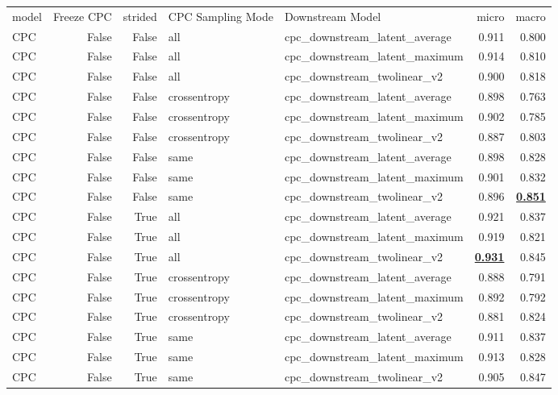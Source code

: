 \begin{adjustbox}{width=\textwidth}
\begin{tabular}{lrrllrr}
{model} & {Freeze CPC} & {strided} & {CPC Sampling Mode} & {Downstream Model} & {micro} & {macro} \\
CPC & False & False & all & cpc\_downstream\_latent\_average & 0.911 & 0.800 \\
CPC & False & False & all & cpc\_downstream\_latent\_maximum & 0.914 & 0.810 \\
CPC & False & False & all & cpc\_downstream\_twolinear\_v2 & 0.900 & 0.818 \\
CPC & False & False & crossentropy & cpc\_downstream\_latent\_average & 0.898 & 0.763 \\
CPC & False & False & crossentropy & cpc\_downstream\_latent\_maximum & 0.902 & 0.785 \\
CPC & False & False & crossentropy & cpc\_downstream\_twolinear\_v2 & 0.887 & 0.803 \\
CPC & False & False & same & cpc\_downstream\_latent\_average & 0.898 & 0.828 \\
CPC & False & False & same & cpc\_downstream\_latent\_maximum & 0.901 & 0.832 \\
CPC & False & False & same & cpc\_downstream\_twolinear\_v2 & 0.896 & \bfseries \underline{0.851} \\
CPC & False & True & all & cpc\_downstream\_latent\_average & 0.921 & 0.837 \\
CPC & False & True & all & cpc\_downstream\_latent\_maximum & 0.919 & 0.821 \\
CPC & False & True & all & cpc\_downstream\_twolinear\_v2 & \bfseries \underline{0.931} & 0.845 \\
CPC & False & True & crossentropy & cpc\_downstream\_latent\_average & 0.888 & 0.791 \\
CPC & False & True & crossentropy & cpc\_downstream\_latent\_maximum & 0.892 & 0.792 \\
CPC & False & True & crossentropy & cpc\_downstream\_twolinear\_v2 & 0.881 & 0.824 \\
CPC & False & True & same & cpc\_downstream\_latent\_average & 0.911 & 0.837 \\
CPC & False & True & same & cpc\_downstream\_latent\_maximum & 0.913 & 0.828 \\
CPC & False & True & same & cpc\_downstream\_twolinear\_v2 & 0.905 & 0.847 \\
\end{tabular}
\end{adjustbox}